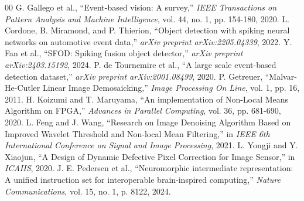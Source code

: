\documentclass[conference]{IEEEtran}
\begin{document}
\begin{thebibliography}{00}
 G. Gallego et al., ``Event-based vision: A survey,'' \textit{IEEE Transactions on Pattern Analysis and Machine Intelligence}, vol. 44, no. 1, pp. 154-180, 2020.
 L. Cordone, B. Miramond, and P. Thierion, ``Object detection with spiking neural networks on automotive event data,'' \textit{arXiv preprint arXiv:2205.04339}, 2022.
 Y. Fan et al., ``SFOD: Spiking fusion object detector,'' \textit{arXiv preprint arXiv:2403.15192}, 2024.
 P. de Tournemire et al., ``A large scale event-based detection dataset,'' \textit{arXiv preprint arXiv:2001.08499}, 2020.
 P. Getreuer, ``Malvar-He-Cutler Linear Image Demosaicking,'' \textit{Image Processing On Line}, vol. 1, pp. 16, 2011.
 H. Koizumi and T. Maruyama, ``An implementation of Non-Local Means Algorithm on FPGA,'' \textit{Advances in Parallel Computing}, vol. 36, pp. 681-690, 2020.
 L. Feng and J. Wang, ``Research on Image Denoising Algorithm Based on Improved Wavelet Threshold and Non-local Mean Filtering,'' in \textit{IEEE 6th International Conference on Signal and Image Processing}, 2021.
 L. Yongji and Y. Xiaojun, ``A Design of Dynamic Defective Pixel Correction for Image Sensor,'' in \textit{ICAIIS}, 2020.
 J. E. Pedersen et al., ``Neuromorphic intermediate representation: A unified instruction set for interoperable brain-inspired computing,'' \textit{Nature Communications}, vol. 15, no. 1, p. 8122, 2024.
\end{thebibliography}
\end{document}
